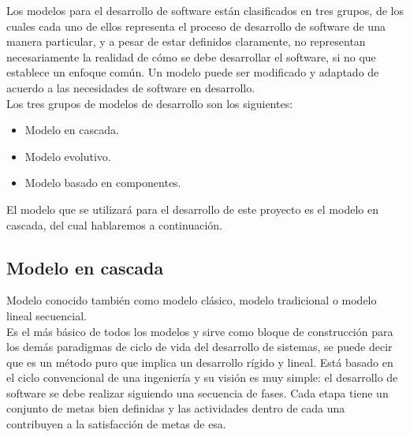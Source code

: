 	Los modelos para el desarrollo de software est\'an clasificados en tres grupos, de los cuales cada uno de ellos representa el proceso de desarrollo de software de una manera particular, y a pesar de estar definidos claramente, no representan necesariamente la realidad de c\'omo  se debe desarrollar el software, si no que establece un enfoque com\'un. Un modelo puede ser modificado y adaptado de acuerdo a las necesidades de software en desarrollo.\\

	Los tres grupos de modelos de desarrollo son los siguientes:
	\begin{itemize}
		\item Modelo en cascada.
		\item Modelo evolutivo.
		\item Modelo basado en componentes.
	\end{itemize}

	El modelo que se utilizar\'a para el desarrollo de este proyecto es el modelo en cascada, del cual hablaremos a continuaci\'on.

	\subsection{Modelo en cascada}

	Modelo conocido tambi\'en como modelo cl\'asico, modelo tradicional o modelo lineal secuencial.\\

	Es el m\'as b\'asico de todos los modelos y sirve como bloque de construcci\'on para los dem\'as paradigmas de ciclo de vida del desarrollo de sistemas, se puede decir que es un m\'etodo puro que implica un desarrollo r\'igido y lineal. Est\'a basado en el ciclo convencional de una ingenier\'ia y su visi\'on es muy simple: el desarrollo de software se debe realizar siguiendo una secuencia de fases. Cada etapa tiene un conjunto de metas bien definidas y las actividades dentro de cada una contribuyen a la satisfacci\'on de metas de esa.

